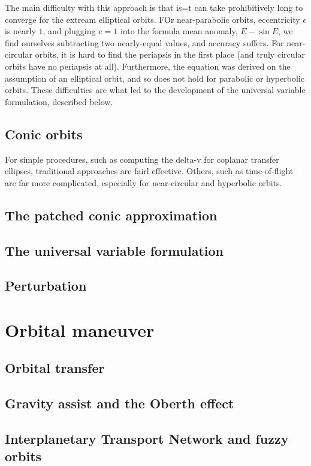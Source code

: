\documentclass[12pt]{article}
\begin{document}
The main difficulty with this approach is that is=t can take prohibitively long to converge for the extream elliptical orbits. FOr near-parabolic orbits, eccentricity \(\epsilon\) is nearly \(1\), and plugging \(e=1\) into the formula mean anomaly, \(E - \sin E\), we find ourselves subtracting two nearly-equal values, and accuracy suffers. For near-circular orbits, it is hard to find the periapsis in the first place (and truly circular orbits have no periapsis at all). Furthermore, the equation was derived on the assumption of an elliptical orbit, and so does not hold for parabolic or hyperbolic orbits. These difficulties are what led to the development of the universal variable formulation, described below.

\subsection{Conic orbits}

For simple procedures, such as computing the delta-v for coplanar transfer ellipses, traditional approaches are fairl effective. Others, such as time-of-flight are far more complicated, especially for near-circular and hyperbolic orbits.

\subsection{The patched conic approximation}

\subsection{The universal variable formulation}

\subsection{Perturbation}

\section{Orbital maneuver}

\subsection{Orbital transfer}

\subsection{Gravity assist and the Oberth effect}

\subsection{Interplanetary Transport Network and fuzzy orbits}
\end{document}
